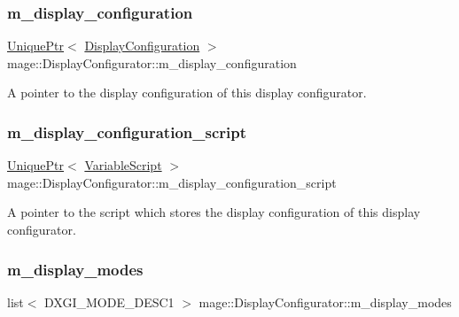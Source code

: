 \subsubsection{\texorpdfstring{m\+\_\+display\+\_\+configuration}{m\_display\_configuration}}
{\footnotesize\ttfamily \hyperlink{namespacemage_a3316d7143a973e37adf1110f2e80ca31}{Unique\+Ptr}$<$ \hyperlink{structmage_1_1_display_configuration}{Display\+Configuration} $>$ mage\+::\+Display\+Configurator\+::m\+\_\+display\+\_\+configuration\hspace{0.3cm}{\ttfamily [private]}}

A pointer to the display configuration of this display configurator. \hypertarget{classmage_1_1_display_configurator_ab4030a5fe67b8253113799f42a0868c0}{}\label{classmage_1_1_display_configurator_ab4030a5fe67b8253113799f42a0868c0} 
\subsubsection{\texorpdfstring{m\+\_\+display\+\_\+configuration\+\_\+script}{m\_display\_configuration\_script}}
{\footnotesize\ttfamily \hyperlink{namespacemage_a3316d7143a973e37adf1110f2e80ca31}{Unique\+Ptr}$<$ \hyperlink{classmage_1_1_variable_script}{Variable\+Script} $>$ mage\+::\+Display\+Configurator\+::m\+\_\+display\+\_\+configuration\+\_\+script\hspace{0.3cm}{\ttfamily [private]}}

A pointer to the script which stores the display configuration of this display configurator. \hypertarget{classmage_1_1_display_configurator_af790f370efc520b3229b3327abd4236b}{}\label{classmage_1_1_display_configurator_af790f370efc520b3229b3327abd4236b} 
\subsubsection{\texorpdfstring{m\+\_\+display\+\_\+modes}{m\_display\_modes}}
{\footnotesize\ttfamily list$<$ D\+X\+G\+I\+\_\+\+M\+O\+D\+E\+\_\+\+D\+E\+S\+C1 $>$ mage\+::\+Display\+Configurator\+::m\+\_\+display\+\_\+modes\hspace{0.3cm}{\ttfamily [private]}}

